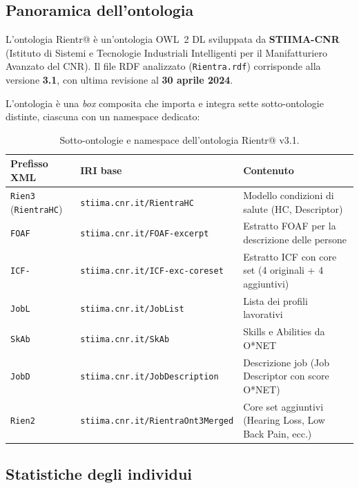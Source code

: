 \documentclass[a4paper,12pt]{article}
\begin{document}
\subsection{Panoramica dell'ontologia}

L'ontologia Rientr@ \`{e} un'ontologia OWL~2 DL sviluppata da
\textbf{STIIMA-CNR} (Istituto di Sistemi e Tecnologie Industriali
Intelligenti per il Manifatturiero Avanzato del CNR). Il file RDF
analizzato (\texttt{Rientra.rdf}) corrisponde alla versione
\textbf{3.1}, con ultima revisione al \textbf{30 aprile 2024}.

L'ontologia \`{e} una \textit{box} composita che importa e integra
sette sotto-ontologie distinte, ciascuna con un namespace dedicato:

\begin{table}[H]
\centering
\caption{Sotto-ontologie e namespace dell'ontologia Rientr@ v3.1.}
\begin{tabular}{L{3.5cm} L{5cm} L{4cm}}
\toprule
\textbf{Prefisso XML} & \textbf{IRI base} & \textbf{Contenuto} \\
\midrule
\texttt{Rien3} (\texttt{RientraHC}) &
  \texttt{stiima.cnr.it/\allowbreak RientraHC} &
  Modello condizioni di salute (HC, Descriptor) \\[3pt]
\texttt{FOAF} &
  \texttt{stiima.cnr.it/\allowbreak FOAF-excerpt} &
  Estratto FOAF per la descrizione delle persone \\[3pt]
\texttt{ICF-} &
  \texttt{stiima.cnr.it/\allowbreak ICF-exc-coreset} &
  Estratto ICF con core set (4 originali + 4 aggiuntivi) \\[3pt]
\texttt{JobL} &
  \texttt{stiima.cnr.it/\allowbreak JobList} &
  Lista dei profili lavorativi \\[3pt]
\texttt{SkAb} &
  \texttt{stiima.cnr.it/\allowbreak SkAb} &
  Skills e Abilities da O*NET \\[3pt]
\texttt{JobD} &
  \texttt{stiima.cnr.it/\allowbreak JobDescription} &
  Descrizione job (Job Descriptor con score O*NET) \\[3pt]
\texttt{Rien2} &
  \texttt{stiima.cnr.it/\allowbreak RientraOnt3Merged} &
  Core set aggiuntivi (Hearing Loss, Low Back Pain, ecc.) \\
\bottomrule
\end{tabular}
\end{table}

\subsection{Statistiche degli individui}
\end{document}

